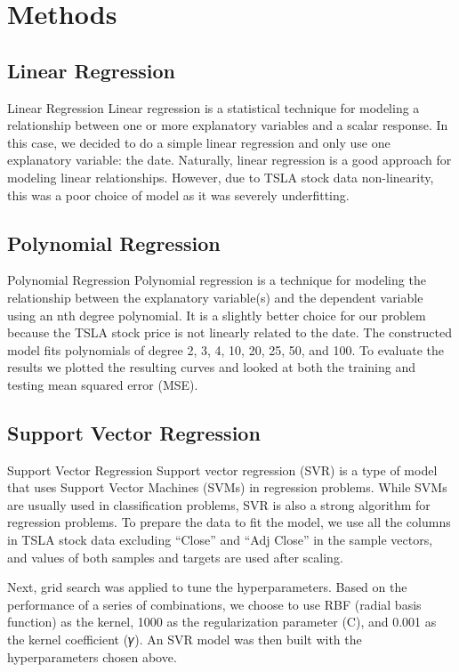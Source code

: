 \documentclass[12pt,a4paper]{article}
\begin{document}
\section{Methods}


\subsection{Linear Regression}
Linear Regression
Linear regression is a statistical technique for modeling a relationship between one or more explanatory variables and a scalar response. In this case, we decided to do a simple linear regression and only use one explanatory variable: the date. Naturally, linear regression is a good approach for modeling linear relationships. However, due to TSLA stock data non-linearity, this was a poor choice of model as it was severely underfitting.

\subsection{Polynomial Regression}
Polynomial Regression
Polynomial regression is a technique for modeling the relationship between the explanatory variable(s) and the dependent variable using an nth degree polynomial. It is a slightly better choice for our problem because the TSLA stock price is not linearly related to the date. The constructed model fits polynomials of degree 2, 3, 4, 10, 20, 25, 50, and 100. To evaluate the results we plotted the resulting curves and looked at both the training and testing mean squared error (MSE).


\subsection{Support Vector Regression}
Support Vector Regression
Support vector regression (SVR) is a type of model that uses Support Vector Machines (SVMs) in regression problems. While SVMs are usually used in classification problems, SVR is also a strong algorithm for regression problems. To prepare the data to fit the model, we use all the columns in TSLA stock data excluding “Close” and “Adj Close” in the sample vectors, and values of both samples and targets are used after scaling. 

Next, grid search was applied to tune the hyperparameters. Based on the performance of a series of combinations, we choose to use RBF (radial basis function) as the kernel, 1000 as the regularization parameter (C), and 0.001 as the kernel coefficient (𝛾). An SVR model was then built with the hyperparameters chosen above. 
\end{document}
